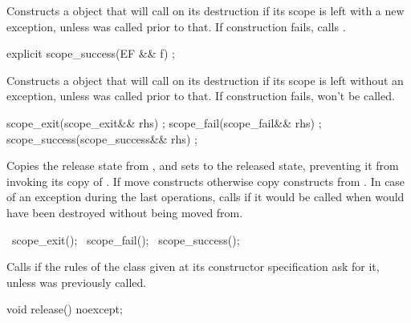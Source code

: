 \documentclass[ebook,11pt,article]{memoir}
\begin{document}
\begin{itemdescr}
\pnum
\effects Constructs a  object that will call  on its destruction if its scope is left with a new exception, unless  was called prior to that. If construction fails, calls .

\end{itemdescr}

\begin{itemdecl}
explicit
scope_success(EF && f) ;
\end{itemdecl}

\begin{itemdescr}
\pnum
\effects Constructs a  object that will call  on its destruction if its scope is left without an exception, unless  was called prior to that.
\enternote
If construction fails,  won't be called.
\exitnote
\end{itemdescr}

\begin{itemdecl}
scope_exit(scope_exit&& rhs) ;
scope_fail(scope_fail&& rhs) ;
scope_success(scope_success&& rhs) ;
\end{itemdecl}

\begin{itemdescr}
\pnum
\effects Copies the release state from , and sets  to the released state, preventing it from invoking its copy of . If  move constructs otherwise copy constructs  from .  In case of an exception during the last operations, calls  if it would be called when  would have been destroyed without being moved from.
\end{itemdescr}

\begin{itemdecl}
~scope_exit();
~scope_fail();
~scope_success();
\end{itemdecl}

\begin{itemdescr}
\pnum
\effects Calls  if the rules of the class given at its constructor specification ask for it, unless  was previously called.
\end{itemdescr}

\begin{itemdecl}
void release() noexcept;
\end{itemdecl}
\end{document}
